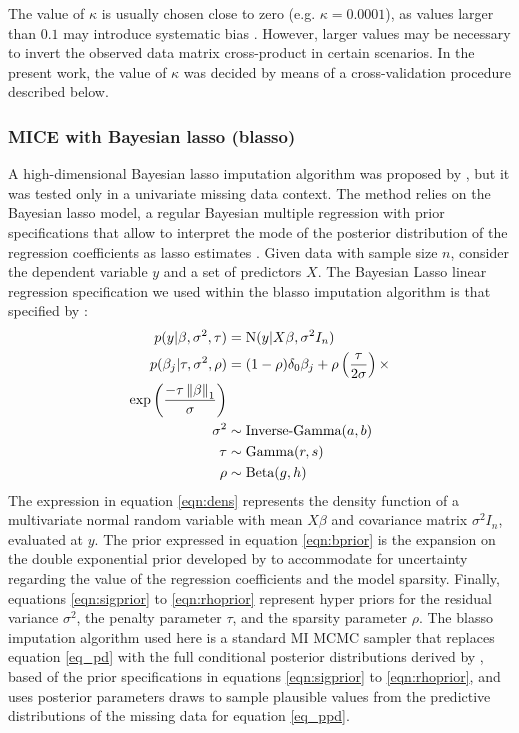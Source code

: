 	The value of $\kappa$ is usually chosen close to zero (e.g. $\kappa = 0.0001$), as values larger than $0.1$ 
	may introduce systematic bias \citep[p. 68]{vanBuuren:2018}.
	However, larger values may be necessary to invert the observed data matrix cross-product in certain scenarios.
	In the present work, the value of $\kappa$ was decided by means of a cross-validation procedure
	described below.

\subsubsection{MICE with Bayesian lasso (blasso)}
	A high-dimensional Bayesian lasso imputation algorithm was proposed by \cite{zhaoLong:2016}, but it was tested only
	in a univariate missing data context.
	The method relies on the Bayesian lasso model, a regular Bayesian multiple regression with prior specifications 
	that allow to interpret the mode of the posterior distribution of the regression coefficients as lasso estimates 
	\citep{parkCasella:2008, hans:2009}.
	Given data with sample size $n$, consider the dependent variable $y$ and a set of predictors $X$.
	The Bayesian Lasso linear regression specification we used within the blasso imputation algorithm is that specified 
	by \cite{hans:2010}:
%
	\begin{align}
		p(y|\beta, \sigma^2, \tau) &= \textrm{N}(y|X\beta, \sigma^2I_n) \label{eqn:dens} \\
		p(\beta_j|\tau, \sigma^2, \rho) &= 
			(1 - \rho) \delta_0 \beta_j +
			\rho \left( \frac{\tau}{2\sigma} \right) \times \\
			\textrm{exp} \left( \frac{-\tau \left\lVert\beta\right\rVert_1}{\sigma} \right) \label{eqn:bprior} \\
		\sigma^2 &\sim \textrm{Inverse-Gamma}(a, b) \label{eqn:sigprior} \\
		\tau &\sim \textrm{Gamma}(r, s) \label{eqn:tauprior} \\
		\rho &\sim \textrm{Beta}(g, h) \label{eqn:rhoprior}
	\end{align}
%	
	The expression in equation \eqref{eqn:dens} represents the density function of a multivariate normal random variable 
	with mean $X\beta$ and covariance matrix $\sigma^2I_n$, evaluated at $y$.
	The prior expressed in equation \eqref{eqn:bprior} is the expansion on the \cite{parkCasella:2008} double exponential 
	prior developed by \cite{hans:2010} to accommodate for uncertainty regarding the value of the regression coefficients 
	and the model sparsity.
	Finally, equations \eqref{eqn:sigprior} to \eqref{eqn:rhoprior} represent hyper priors for the residual variance 
	$\sigma^2$, the penalty parameter $\tau$, and the sparsity parameter $\rho$.
	The blasso imputation algorithm used here is a standard MI MCMC sampler that replaces equation \eqref{eq_pd} with the 
	full conditional posterior distributions derived by \citet{hans:2010}, based of the prior specifications in equations
	\eqref{eqn:sigprior} to \eqref{eqn:rhoprior}, and uses posterior parameters draws to sample plausible values from the 
	predictive distributions of the missing data for equation \eqref{eq_ppd}.

